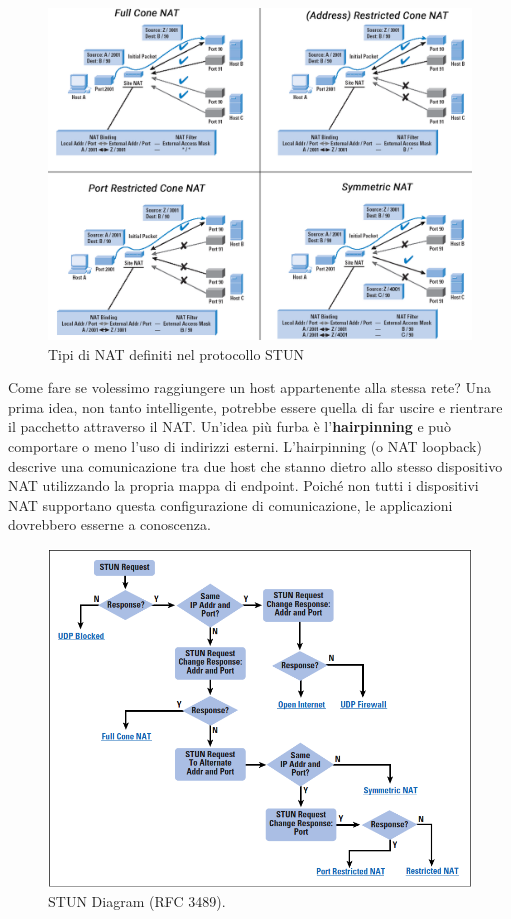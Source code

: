 \begin{figure}[htbp]
	\centering
	\includegraphics[scale = 0.4]{images/nat_types.png}
	\caption{Tipi di NAT definiti nel protocollo STUN}
	\label{img:NAT_Types}
\end{figure}

Come fare se volessimo raggiungere un host appartenente alla stessa rete? Una prima idea, non tanto intelligente, potrebbe essere quella di far uscire e rientrare il pacchetto attraverso il NAT. Un'idea più furba è l'\textbf{hairpinning} e può comportare o meno l'uso di indirizzi esterni. L'hairpinning (o NAT loopback) descrive una comunicazione tra due host che stanno dietro allo stesso dispositivo NAT utilizzando la propria mappa di endpoint. Poiché non tutti i dispositivi NAT supportano questa configurazione di comunicazione, le applicazioni dovrebbero esserne a conoscenza.
\begin{figure}[htbp]
	\centering
	\includegraphics[scale = 0.4]{images/STUN}
	\caption{STUN Diagram (RFC 3489).}
	\label{img:STUN}
\end{figure}

